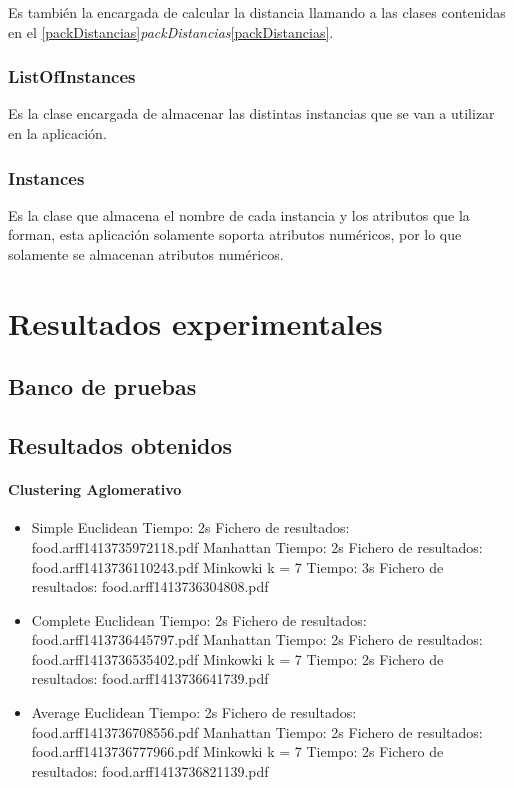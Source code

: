 \documentclass[11pt, titlepage,a4paper]{article}
\begin{document}
Es también la encargada de calcular la distancia llamando a las clases
contenidas en el
\ref{packDistancias}\textit{packDistancias}\ref{packDistancias}.

\subsubsection{ListOfInstances}
Es la clase encargada de almacenar las distintas instancias que se van a
utilizar en la aplicación.

\subsubsection{Instances}
Es la clase que almacena el nombre de cada instancia y los atributos que la
forman, esta aplicación solamente soporta atributos numéricos, por lo que
solamente se almacenan atributos numéricos.


\section{Resultados experimentales}

\subsection{Banco de pruebas}

\subsection{Resultados obtenidos}
\paragraph{Clustering Aglomerativo\\}
\begin{itemize}
  \item Simple
  	\subitem Euclidean
  		\subsubitem Tiempo: 2s
  		\subsubitem Fichero de resultados: food.arff1413735972118.pdf
	\subitem Manhattan
		\subsubitem Tiempo: 2s
  		\subsubitem Fichero de resultados: food.arff1413736110243.pdf
	\subitem Minkowki k = 7
		\subsubitem Tiempo: 3s 
  		\subsubitem Fichero de resultados: food.arff1413736304808.pdf 	
  \item Complete
	\subitem Euclidean
  		\subsubitem Tiempo: 2s
  		\subsubitem Fichero de resultados: food.arff1413736445797.pdf 
	\subitem Manhattan
		\subsubitem Tiempo: 2s
  		\subsubitem Fichero de resultados: food.arff1413736535402.pdf 
	\subitem Minkowki k = 7
		\subsubitem Tiempo: 2s
  		\subsubitem Fichero de resultados: food.arff1413736641739.pdf 	
  \item Average
  	\subitem Euclidean
  		\subsubitem Tiempo: 2s
  		\subsubitem Fichero de resultados: food.arff1413736708556.pdf 
	\subitem Manhattan
		\subsubitem Tiempo: 2s
  		\subsubitem Fichero de resultados: food.arff1413736777966.pdf
	\subitem Minkowki k = 7
		\subsubitem Tiempo: 2s
  		\subsubitem Fichero de resultados: food.arff1413736821139.pdf	
\end{itemize}
\end{document}
